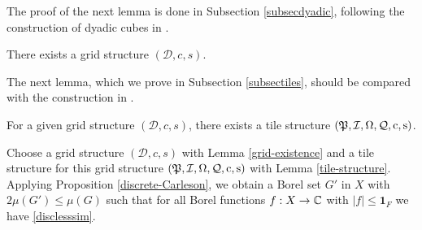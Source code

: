 The proof of the next lemma is done in Subsection \ref{subsecdyadic},
following the construction of dyadic cubes in \cite[\S 3]{christ1990b}.

\begin{lemma}
\label{grid-existence}
     There exists a grid structure $(\mathcal{D}, c,s)$.
\end{lemma}




The next lemma, which we prove in Subsection \ref{subsectiles}, should be compared
with the construction in \cite[Lemma 2.12]{zk-polynomial}.

\begin{lemma}
\label{tile-structure}
    For a given grid structure $(\mathcal{D}, c,s)$, there exists a tile structure
    $({\mathfrak P},{\mathcal{I}},{\Omega},{\mathcal{Q}},{\mathrm{c}},{\mathrm{s}})$.
\end{lemma}

Choose a grid structure $(\mathcal{D}, c,s)$ with Lemma \ref{grid-existence} and a tile structure for this
grid structure $({\mathfrak P},{\mathcal{I}},{\Omega},{\mathcal{Q}},{\mathrm{c}},{\mathrm{s}})$ with Lemma \ref{tile-structure}.
Applying Proposition \ref{discrete-Carleson}, we obtain a Borel set $G'$ in $X$ with $2\mu(G')\leq \mu(G)$ such that for all Borel functions $f:X\to {\mathbb{C}}$ with $|f|\le \mathbf{1}_F$
we have \eqref{disclesssim}.

